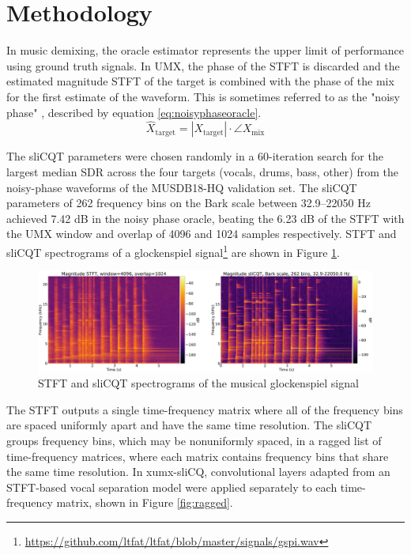 \documentclass{article}
\begin{document}
\section{Methodology}
\label{sec:method}

In music demixing, the oracle estimator represents the upper limit of performance using ground truth signals. In UMX, the phase of the STFT is discarded and the estimated magnitude STFT of the target is combined with the phase of the mix for the first estimate of the waveform. This is sometimes referred to as the "noisy phase" \cite{noisyphase1}, described by equation \eqref{eq:noisyphaseoracle}.
\begin{equation}\label{eq:noisyphaseoracle}
\hat{X}_{\text{target}} = |X_{\text{target}}| \cdot \angle{X_{\text{mix}}}
\end{equation}

The sliCQT parameters were chosen randomly in a 60-iteration search for the largest median SDR across the four targets (vocals, drums, bass, other) from the noisy-phase waveforms of the MUSDB18-HQ \cite{musdb18hq} validation set. The sliCQT parameters of 262 frequency bins on the Bark scale between 32.9--22050 Hz achieved 7.42 dB in the noisy phase oracle, beating the 6.23 dB of the STFT with the UMX window and overlap of 4096 and 1024 samples respectively. STFT and sliCQT spectrograms of a glockenspiel signal\footnote{\url{https://github.com/ltfat/ltfat/blob/master/signals/gspi.wav}} are shown in Figure \ref{fig:spectrograms}.

\begin{figure}[h]
	\includegraphics[width=\textwidth]{./spectrograms_comparison.png}
	\caption{STFT and sliCQT spectrograms of the musical glockenspiel signal}
	\label{fig:spectrograms}
\end{figure}

The STFT outputs a single time-frequency matrix where all of the frequency bins are spaced uniformly apart and have the same time resolution. The sliCQT groups frequency bins, which may be nonuniformly spaced, in a ragged list of time-frequency matrices, where each matrix contains frequency bins that share the same time resolution. In xumx-sliCQ, convolutional layers adapted from an STFT-based vocal separation model \cite{plumbley2} were applied separately to each time-frequency matrix, shown in Figure \ref{fig:ragged}.
\end{document}
